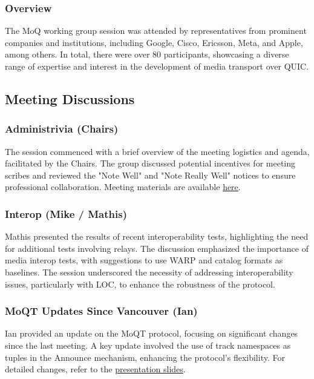 \documentclass{article}
\begin{document}
\subsubsection{Overview}
The MoQ working group session was attended by representatives from prominent companies and institutions, including Google, Cisco, Ericsson, Meta, and Apple, among others. In total, there were over 80 participants, showcasing a diverse range of expertise and interest in the development of media transport over QUIC.

\subsection{Meeting Discussions}

\subsubsection{Administrivia (Chairs)}
The session commenced with a brief overview of the meeting logistics and agenda, facilitated by the Chairs. The group discussed potential incentives for meeting scribes and reviewed the "Note Well" and "Note Really Well" notices to ensure professional collaboration. Meeting materials are available \href{https://datatracker.ietf.org/meeting/121/materials/slides-121-moq-chair-slides-00}{here}.

\subsubsection{Interop (Mike / Mathis)}
Mathis presented the results of recent interoperability tests, highlighting the need for additional tests involving relays. The discussion emphasized the importance of media interop tests, with suggestions to use WARP and catalog formats as baselines. The session underscored the necessity of addressing interoperability issues, particularly with LOC, to enhance the robustness of the protocol.

\subsubsection{MoQT Updates Since Vancouver (Ian)}
Ian provided an update on the MoQT protocol, focusing on significant changes since the last meeting. A key update involved the use of track namespaces as tuples in the Announce mechanism, enhancing the protocol's flexibility. For detailed changes, refer to the \href{https://datatracker.ietf.org/meeting/121/materials/slides-121-moq-moq-transport-updates-since-vancouver-00}{presentation slides}.
\end{document}
